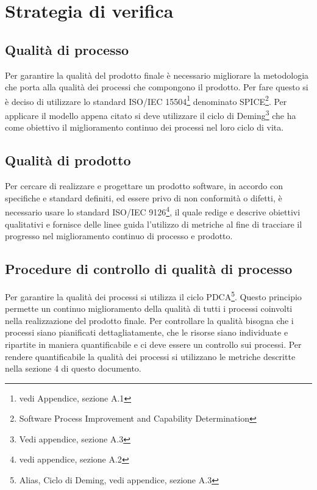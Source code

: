 \newpage
\section{Strategia di verifica}%
\label{2.0}
\subsection{Qualità di processo} %
\label{2.1}
Per garantire la qualità del prodotto finale è necessario migliorare la metodologia che porta alla qualità dei processi che compongono il prodotto. Per fare questo si è deciso di utilizzare lo standard ISO/IEC 15504\footnote{vedi Appendice, sezione A.1} denominato SPICE\footnote{Software Process Improvement and Capability Determination}.
Per applicare il modello appena citato si deve utilizzare il ciclo di Deming\footnote{Vedi appendice, sezione A.3} che ha come obiettivo il miglioramento continuo dei processi nel loro ciclo di vita.

\subsection{Qualità di prodotto} %
\label{2.2}
Per cercare di realizzare e progettare un prodotto software, in accordo con specifiche e standard definiti, ed essere privo di non conformità o difetti, è necessario usare lo standard ISO/IEC 9126\footnote{vedi appendice, sezione A.2}, il quale redige e descrive obiettivi qualitativi e fornisce delle linee guida l'utilizzo di metriche al fine di tracciare il progresso nel miglioramento continuo di processo e prodotto.

\subsection{Procedure di controllo di qualità di processo} %
\label{2.3}
Per garantire la qualità dei processi si utilizza il ciclo PDCA\footnote{Alias, Ciclo di Deming, vedi appendice, sezione A.3}.  Questo principio permette un continuo miglioramento della qualità di tutti i processi coinvolti nella realizzazione del prodotto finale.
Per controllare la qualità bisogna che i processi siano pianificati dettagliatamente, che le risorse siano individuate e ripartite in maniera quantificabile e ci deve essere un controllo sui processi.
Per rendere quantificabile la qualità dei processi si utilizzano le metriche descritte nella sezione 4 di questo documento.

